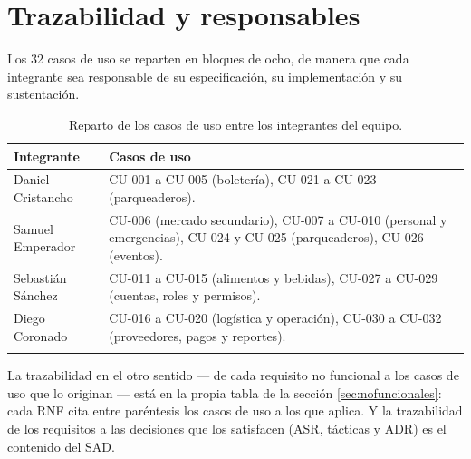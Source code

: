 \documentclass[11pt,a4paper]{article}
\begin{document}


\section{Trazabilidad y responsables}
\label{sec:trazabilidad}

Los 32 casos de uso se reparten en bloques de ocho, de manera que cada integrante sea responsable
de su especificación, su implementación y su sustentación.

\begin{center}
\begin{longtable}{P{3.8cm}P{10.7cm}}
\toprule
\textbf{Integrante} & \textbf{Casos de uso}\\
\midrule
\endhead
Daniel Cristancho & CU-001 a CU-005 (boletería), CU-021 a CU-023 (parqueaderos).\\[0.3em]
Samuel Emperador & CU-006 (mercado secundario), CU-007 a CU-010 (personal y emergencias),
CU-024 y CU-025 (parqueaderos), CU-026 (eventos).\\[0.3em]
Sebastián Sánchez & CU-011 a CU-015 (alimentos y bebidas), CU-027 a CU-029 (cuentas, roles y
permisos).\\[0.3em]
Diego Coronado & CU-016 a CU-020 (logística y operación), CU-030 a CU-032 (proveedores, pagos y
reportes).\\
\bottomrule
\caption{Reparto de los casos de uso entre los integrantes del equipo.}
\label{tab:reparto}
\end{longtable}
\end{center}

La trazabilidad en el otro sentido --- de cada requisito no funcional a los casos de uso que lo
originan --- está en la propia tabla de la sección \ref{sec:nofuncionales}: cada RNF cita entre
paréntesis los casos de uso a los que aplica. Y la trazabilidad de los requisitos a las decisiones
que los satisfacen (ASR, tácticas y ADR) es el contenido del SAD.
\end{document}

